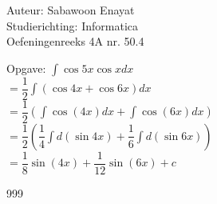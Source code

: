 \documentclass[a4paper]{article}
\begin{document}
  
\noindent \large Auteur: Sabawoon Enayat \\
\noindent \large Studierichting: Informatica\\
\noindent \large Oefeningenreeks 4A nr. 50.4 \\

\newcommand{\dint}{\displaystyle\int}

\medskip

\normalsize

Opgave: $\dint \cos 5x \cos x dx$\\

$= \dfrac{1}{2}\dint (\cos 4x + \cos 6x) dx$\\

$= \dfrac{1}{2}\left(\dint \cos (4x) dx + \dint \cos (6x) dx\right)$\\

$= \dfrac{1}{2}\left(\dfrac{1}{4}\dint d(\sin 4x) + \dfrac{1}{6}\dint d(\sin 6x)\right)$\\

$= \dfrac{1}{8}\sin (4x) + \dfrac{1}{12}\sin (6x) + c$\\

\begin{thebibliography}{999}
\end{thebibliography}
\end{document}
